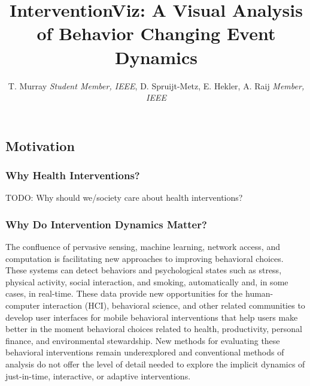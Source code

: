 \documentclass[review,journal]{vgtc}         %
\title{InterventionViz: A Visual Analysis of Behavior Changing Event Dynamics}
\author{T. Murray \textit{Student Member, IEEE}, D. Spruijt-Metz, E. Hekler, A. Raij \textit{Member, IEEE}}
\begin{document}


\maketitle


\subsection{Motivation}

\subsubsection{Why Health Interventions?}
TODO: Why should we/society care about health interventions?

\subsubsection{Why Do Intervention Dynamics Matter?}
The confluence of pervasive sensing, machine learning, network access, and computation is facilitating new approaches to improving behavioral choices.
These systems can detect behaviors and psychological states such as stress\cite{chang2011,lu2012}, physical activity\cite{li2010,emken2012}, social interaction\cite{wyatt2011}, and smoking\cite{sazonov2011}, automatically and, in some cases, in real-time.
These data provide new opportunities for the human-computer interaction (HCI), behavioral science, and other related communities to develop user interfaces for mobile behavioral interventions that help users make better in the moment behavioral choices related to health\cite{klasnja2012,nahum2012}, productivity\cite{ho2005,sohn2005,jewell2011}, personal finance\cite{gallego2012}, and environmental stewardship.\cite{elliott2012}
New methods for evaluating these behavioral interventions remain underexplored and conventional methods of analysis do not offer the level of detail needed to explore the implicit dynamics of just-in-time, interactive, or adaptive interventions.
\end{document}

